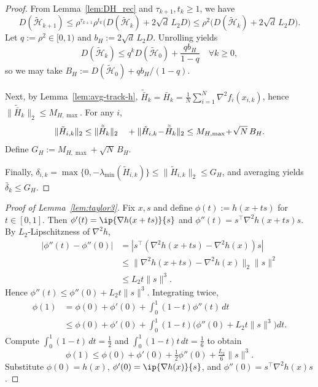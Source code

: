 \documentclass[review,onefignum,onetabnum]{siamart171218}
\begin{document}
\begin{proof}
From Lemma~\ref{lem:DH_rec} and $\tau_{k+1},t_k\ge 1$, we have
\[
D(\tilde{\mathcal H}_{k+1})
\le \rho^{\tau_{k+1}}\rho^{t_k}\Big(D(\tilde{\mathcal H}_k)+2\sqrt d\,L_2D\Big)
\le \rho^2\Big(D(\tilde{\mathcal H}_k)+2\sqrt d\,L_2D\Big).
\]
Let $q:=\rho^2\in[0,1)$ and $b_H:=2\sqrt d\,L_2D$. Unrolling yields
\[
D(\tilde{\mathcal H}_k)\le q^k D(\tilde{\mathcal H}_0)+\frac{qb_H}{1-q}\quad \forall k\ge 0,
\]
so we may take $B_H:=D(\tilde{\mathcal H}_0)+qb_H/(1-q)$.

Next, by Lemma~\ref{lem:avg-track-h},
$\tilde{\bar H}_k=\bar H_k=\frac1N\sum_{i=1}^N\nabla^2 f_i(x_{i,k})$,
hence $\|\tilde{\bar H}_k\|_2\le M_{H,\max}$.
For any $i$,
\[
\|\tilde H_{i,k}\|_2
\le \|\tilde{\bar H}_k\|_2\\
\quad + \|\tilde H_{i,k}\!-\!\tilde{\bar H}_k\|_2
\le M_{H,\max}\!+\!\sqrt{N}\,B_H.
\]
Define $G_H:=M_{H,\max} + \sqrt{N}\,B_H$.

Finally, $\delta_{i,k}=\max\{0,-\lambda_{\min}(\tilde H_{i,k})\}
\le \|\tilde H_{i,k}\|_2\le G_H$,
and averaging yields $\bar\delta_k\le G_H$.
\end{proof}

\begin{proof}[Proof of Lemma~\ref{lem:taylor3}]
Fix $x,s$ and define $\phi(t):=h(x+ts)$ for $t\in[0,1]$.
Then $\phi'(t)=\ip{\nabla h(x+ts)}{s}$ and $\phi''(t)=s^\top\nabla^2 h(x+ts)s$.
By $L_2$-Lipschitzness of $\nabla^2 h$,
\begin{align*}
|\phi''(t)\!-\!\phi''(0)|
&=|s^\top(\nabla^2 h(x\!+\!ts)\!-\!\nabla^2 h(x))s|\\
&\le \|\nabla^2 h(x\!+\!ts)\!-\!\nabla^2 h(x)\|_2\|s\|^2\\
&\le L_2 t\|s\|^3.
\end{align*}
Hence $\phi''(t)\le \phi''(0)+L_2 t\|s\|^3$.
Integrating twice,
\begin{align*}
\phi(1)&=\phi(0)+\phi'(0)+\int_0^1\!(1\!-\!t)\phi''(t)\,dt\\
&\le \phi(0)+\phi'(0)+\!\int_0^1\!(1\!-\!t)\big(\phi''(0)+L_2 t\|s\|^3\big)dt.
\end{align*}
Compute $\int_0^1(1-t)\,dt=\tfrac12$ and $\int_0^1(1-t)t\,dt=\tfrac16$ to obtain
\[
\phi(1)\le \phi(0)+\phi'(0)+\tfrac12\phi''(0)+\tfrac{L_2}{6}\|s\|^3.
\]
Substitute $\phi(0)=h(x)$, $\phi'(0)=\ip{\nabla h(x)}{s}$, and $\phi''(0)=s^\top\nabla^2 h(x)s$.
\end{proof}
\end{document}
